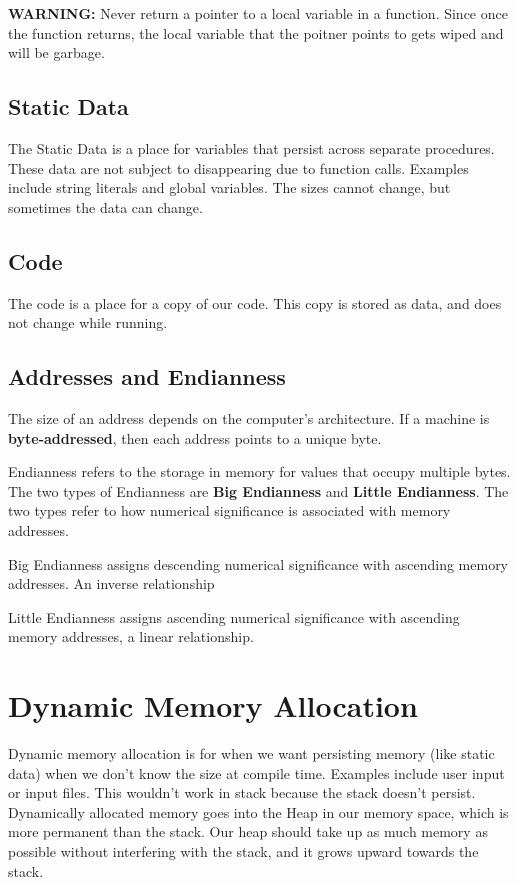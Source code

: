 \documentclass[letterpaper]{article}
\theoremstyle{remark}
\begin{document}
\textbf{WARNING:} Never return a pointer to a local variable in a function. Since once the function returns, the local variable that the poitner points to gets wiped and will be garbage.

\subsection{Static Data}
The Static Data is a place for variables that persist across separate procedures. These data are not subject to disappearing due to function calls. Examples include string literals and global variables. The sizes cannot change, but sometimes the data can change.

\subsection{Code}
The code is a place for a copy of our code. This copy is stored as data, and does not change while running.

\subsection{Addresses and Endianness}
The size of an address depends on the computer's architecture. If a machine is \textbf{byte-addressed}, then each address points to a unique byte. 

Endianness refers to the storage in memory for values that occupy multiple bytes. The two types of Endianness are \textbf{Big Endianness} and \textbf{Little Endianness}. The two types refer to how numerical significance is associated with memory addresses.

Big Endianness assigns descending numerical significance with ascending memory addresses. An inverse relationship

Little Endianness assigns ascending numerical significance with ascending memory addresses, a linear relationship.

\section{Dynamic Memory Allocation}
Dynamic memory allocation is for when we want persisting memory (like static data) when we don't know the size at compile time. Examples include user input or input files. This wouldn't work in stack because the stack doesn't persist. Dynamically allocated memory goes into the Heap in our memory space, which is more permanent than the stack. Our heap should take up as much memory as possible without interfering with the stack, and it grows upward towards the stack.
\end{document}
